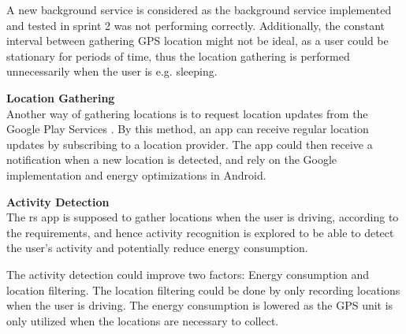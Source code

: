 A new background service is considered as the background service implemented and tested in sprint 2 was not performing correctly.
Additionally, the constant interval between gathering GPS location might not be ideal, as a user could be stationary for periods of time, thus the location gathering is performed unnecessarily when the user is e.g. sleeping.

\textbf{Location Gathering}\\
Another way of gathering locations is to request location updates from the Google Play Services \cite{receivingLocationUpdates}.
By this method, an app can receive regular location updates by subscribing to a location provider.
The app could then receive a notification when a new location is detected, and rely on the Google implementation and energy optimizations in Android.

\textbf{Activity Detection}\\
The \gls{rs} app is supposed to gather locations when the user is driving, according to the requirements, and hence activity recognition is explored to be able to detect the user's activity and potentially reduce energy consumption.

The activity detection could improve two factors: Energy consumption and location filtering.
The location filtering could be done by only recording locations when the user is driving.
The energy consumption is lowered as the GPS unit is only utilized when the locations are necessary to collect.
